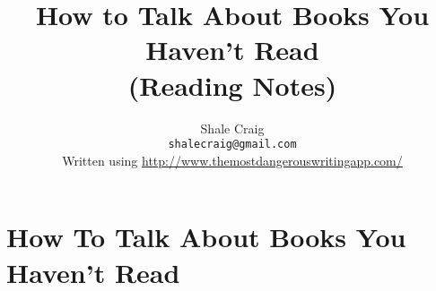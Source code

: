 \ifdefined\isphone
  
\else
  
\fi



\title{How to Talk About Books You Haven't Read \\ (Reading Notes)}

\author{
    Shale Craig\\
    \texttt{shalecraig@gmail.com} \\
    Written using \url{http://www.themostdangerouswritingapp.com/}
}

\maketitle

\tableofcontents

\part{How To Talk About Books You Haven't Read}





